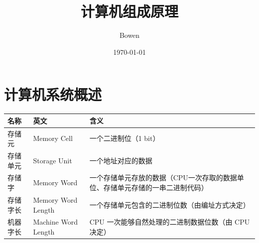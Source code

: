 \documentclass[a4paper,12pt]{article}
\begin{document}
    \title{计算机组成原理}
    \author{Bowen}
    \date{\today}
    \maketitle
    \renewcommand{\contentsname}{}
    \tableofcontents
    \newpage


    \section{计算机系统概述}

    \begin{table}[htbp]
        \centering
        \renewcommand{\arraystretch}{1.5}   %
        \setlength{\tabcolsep}{8pt}         %
        \small
        \begin{tabular}{|
                >{\centering\arraybackslash}m{1.8cm}|
                >{\centering\arraybackslash}m{3.5cm}|
                >{\centering\arraybackslash}m{10cm}|}
            \hline
            \textbf{名称} & \textbf{英文}         & \textbf{含义}                              \\
            \hline
            存储元         & Memory Cell         & 一个二进制位（1 bit）                            \\
            \hline
            存储单元        & Storage Unit        & 一个地址对应的数据                                \\
            \hline
            存储字         & Memory Word         & 一个存储单元存放的数据（CPU一次存取的数据单位、存储单元存储的一串二进制代码） \\
            \hline
            存储字长        & Memory Word Length  & 一个存储单元包含的二进制位数（由编址方式决定）                  \\
            \hline
            机器字长        & Machine Word Length & CPU 一次能够自然处理的二进制数据位数（由 CPU 决定）           \\
            \hline
        \end{tabular}
    \end{table}
\end{document}
